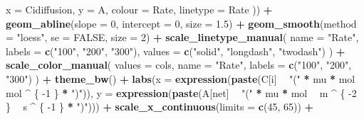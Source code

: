 \documentclass[
]{krantz}
\makeatletter
\newenvironment{Shaded}{\begin{snugshade}}{\end{snugshade}}
\newcommand{\DataTypeTok}[1]{\textcolor[rgb]{0.13,0.29,0.53}{#1}}
\newcommand{\DecValTok}[1]{\textcolor[rgb]{0.00,0.00,0.81}{#1}}
\newcommand{\FloatTok}[1]{\textcolor[rgb]{0.00,0.00,0.81}{#1}}
\newcommand{\KeywordTok}[1]{\textcolor[rgb]{0.13,0.29,0.53}{\textbf{#1}}}
\newcommand{\NormalTok}[1]{#1}
\newcommand{\OperatorTok}[1]{\textcolor[rgb]{0.81,0.36,0.00}{\textbf{#1}}}
\newcommand{\OtherTok}[1]{\textcolor[rgb]{0.56,0.35,0.01}{#1}}
\newcommand{\StringTok}[1]{\textcolor[rgb]{0.31,0.60,0.02}{#1}}
\newenvironment{kframe}{%
\medskip{}
\setlength{\fboxsep}{.8em}
 \def\at@end@of@kframe{}%
 \ifinner\ifhmode%
  \def\at@end@of@kframe{\end{minipage}}%
  \begin{minipage}{\columnwidth}%
 \fi\fi%
 \def\FrameCommand##1{\hskip\@totalleftmargin \hskip-\fboxsep
 \colorbox{shadecolor}{##1}\hskip-\fboxsep
     \hskip-\linewidth \hskip-\@totalleftmargin \hskip\columnwidth}%
 \MakeFramed {\advance\hsize-\width
   \@totalleftmargin\z@ \linewidth\hsize
   \@setminipage}}%
 {\par\unskip\endMakeFramed%
 \at@end@of@kframe}
\renewenvironment{Shaded}{\begin{kframe}}{\end{kframe}}
\makeatother
\begin{document}
\begin{Shaded}
\begin{Highlighting}[]
    \DataTypeTok{x =}\NormalTok{ Cidiffusion,}
    \DataTypeTok{y =}\NormalTok{ A,}
    \DataTypeTok{colour =}\NormalTok{ Rate,}
    \DataTypeTok{linetype =}\NormalTok{ Rate}
\NormalTok{  )) }\OperatorTok{+}
\StringTok{  }\KeywordTok{geom_abline}\NormalTok{(}\DataTypeTok{slope =} \DecValTok{0}\NormalTok{,}
              \DataTypeTok{intercept =} \DecValTok{0}\NormalTok{,}
              \DataTypeTok{size =} \FloatTok{1.5}\NormalTok{) }\OperatorTok{+}
\StringTok{  }\KeywordTok{geom_smooth}\NormalTok{(}\DataTypeTok{method =} \StringTok{"loess"}\NormalTok{, }\DataTypeTok{se =} \OtherTok{FALSE}\NormalTok{, }\DataTypeTok{size =} \DecValTok{2}\NormalTok{) }\OperatorTok{+}
\StringTok{  }\KeywordTok{scale_linetype_manual}\NormalTok{(}
    \DataTypeTok{name =} \StringTok{"Rate"}\NormalTok{,}
    \DataTypeTok{labels =} \KeywordTok{c}\NormalTok{(}\StringTok{"100"}\NormalTok{, }\StringTok{"200"}\NormalTok{, }\StringTok{"300"}\NormalTok{),}
    \DataTypeTok{values =} \KeywordTok{c}\NormalTok{(}\StringTok{"solid"}\NormalTok{, }\StringTok{"longdash"}\NormalTok{, }\StringTok{"twodash"}\NormalTok{)}
\NormalTok{  ) }\OperatorTok{+}
\StringTok{  }\KeywordTok{scale_color_manual}\NormalTok{(}
    \DataTypeTok{values =}\NormalTok{ cols,}
    \DataTypeTok{name =} \StringTok{"Rate"}\NormalTok{,}
    \DataTypeTok{labels =} \KeywordTok{c}\NormalTok{(}\StringTok{"100"}\NormalTok{, }\StringTok{"200"}\NormalTok{, }\StringTok{"300"}\NormalTok{)}
\NormalTok{  ) }\OperatorTok{+}
\StringTok{  }\KeywordTok{theme_bw}\NormalTok{() }\OperatorTok{+}
\StringTok{  }\KeywordTok{labs}\NormalTok{(}\DataTypeTok{x =} \KeywordTok{expression}\NormalTok{(}\KeywordTok{paste}\NormalTok{(C[i] }\OperatorTok{~}\StringTok{ "("} \OperatorTok{*}\StringTok{ }\NormalTok{mu }\OperatorTok{*}\StringTok{ }\NormalTok{mol }\OperatorTok{~}\StringTok{ }\NormalTok{mol }\OperatorTok{^}\StringTok{ }\NormalTok{\{}
    \DecValTok{-1}
\NormalTok{  \} }\OperatorTok{*}\StringTok{ ")"}\NormalTok{)), }\DataTypeTok{y =} \KeywordTok{expression}\NormalTok{(}\KeywordTok{paste}\NormalTok{(A[net] }\OperatorTok{~}\StringTok{ "("} \OperatorTok{*}\StringTok{ }\NormalTok{mu }\OperatorTok{*}\StringTok{ }\NormalTok{mol }\OperatorTok{~}\StringTok{ }\NormalTok{m }\OperatorTok{^}\StringTok{ }\NormalTok{\{}
    \DecValTok{-2}
\NormalTok{  \} }\OperatorTok{~}\StringTok{ }\NormalTok{s }\OperatorTok{^}\StringTok{ }\NormalTok{\{}
    \DecValTok{-1}
\NormalTok{  \} }\OperatorTok{*}\StringTok{ ")"}\NormalTok{))) }\OperatorTok{+}
\StringTok{  }\KeywordTok{scale_x_continuous}\NormalTok{(}\DataTypeTok{limits =} \KeywordTok{c}\NormalTok{(}\DecValTok{45}\NormalTok{, }\DecValTok{65}\NormalTok{)) }\OperatorTok{+}

\end{Highlighting}
\end{Shaded}
\end{document}
